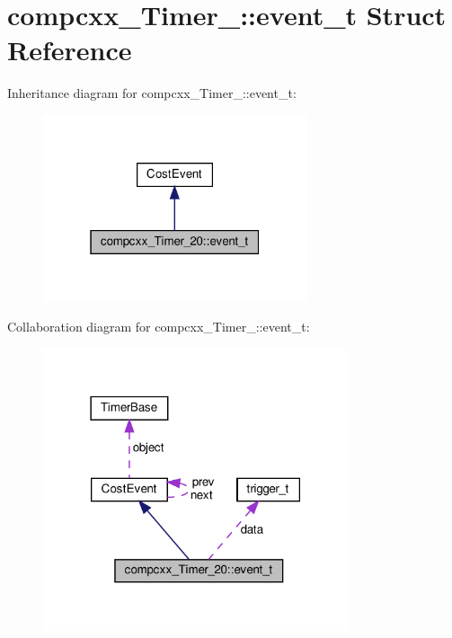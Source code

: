 \hypertarget{structcompcxx__Timer__20_1_1event__t}{}\section{compcxx\+\_\+\+Timer\+\_\+:\+:event\+\_\+t Struct Reference}
\label{structcompcxx__Timer__20_1_1event__t}


Inheritance diagram for compcxx\+\_\+\+Timer\+\_\+:\+:event\+\_\+t\+:\nopagebreak
\begin{figure}[H]
\begin{center}
\leavevmode
\includegraphics[width=220pt]{structcompcxx__Timer__20_1_1event__t__inherit__graph}
\end{center}
\end{figure}


Collaboration diagram for compcxx\+\_\+\+Timer\+\_\+:\+:event\+\_\+t\+:\nopagebreak
\begin{figure}[H]
\begin{center}
\leavevmode
\includegraphics[width=254pt]{structcompcxx__Timer__20_1_1event__t__coll__graph}
\end{center}
\end{figure}
